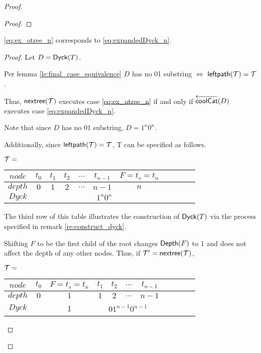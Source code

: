 \begin{proof}
\begin{proof}





\end{proof}
\begin{lemma}
    \eqref{eq:ex_otree_n} corresponds to \eqref{eq:expandedDyck_n}.
\end{lemma}
\begin{proof}

    Let $D=\mathsf{Dyck}{(T)}$.

    Per lemma \ref{le:final_case_equivalence} $D$ has no 01 substring $\iff$ $\mathsf{leftpath}{(\mathcal{\mathcal{T}})}=\mathcal{T}$.  

    Thus, $\mathsf{nextree}{(\mathcal{T})}$ executes case \eqref{eq:ex_otree_n} if and only if $\overleftarrow{\mathsf{coolCat}}{(D)}$ executes case  \eqref{eq:expandedDyck_n}.

    Note that since $D$ has no $01$ substring, $D=1^n0^n$. 

    Additionally, since $\mathsf{leftpath}{(\mathcal{\mathcal{T}})}=\mathcal{T}$, T can be specified as follows.

    $\mathcal{T}=$
    \begin{center}
	\begin{tabular}{ |c|c|c|c|c|c|c|c|c|c|c| } 
	    \hline

	    $node$ & $t_0$ & $t_1$  & $t_2$ & $\dots$ & $t_{n-1}$&$F=t_s=t_n$  \\
	    \hline
	    $depth$ & $0$ & $1$ & $2$ & $\dots$ & $n-1$ & $n$ \\
	    \hline
	    $Dyck$ &  &  \multicolumn{5}{|c|}{$1^n0^n$} \\
	    \hline
	\end{tabular}
    \end{center}

    The third row of this table illustrates the construction of $\mathsf{Dyck}{(T)}$ via the process specified in remark \ref{re:construct_dyck}.

    Shifting $F$ to be the first child of the root changes $\mathsf{Depth}{(F)}$ to 1 and does not affect the depth of any other nodes.  Thus, if $\mathcal{T}'=\mathsf{nextree}{(\mathcal{T})}$, 


    $\mathcal{T}=$
    \begin{center}
	\begin{tabular}{ |c|c|c|c|c|c|c|c|c|c|c| } 
	    \hline

	    $node$ & $t_0$ & $F=t_s=t_n$ & $t_1$  & $t_2$ & $\dots$ & $t_{n-1}$  \\
	    \hline
	    $depth$ & $0$ & $1$ & $1$ & $2$ & $\dots$ & $n-1$ \\
	    \hline
	    $Dyck$ &  &  1 &  \multicolumn{4}{|c|}{$01^{n-1}0^{n-1}$} \\
	    \hline
	\end{tabular}
    \end{center}


\end{proof}
\end{proof}
